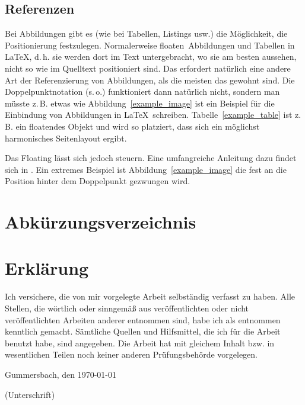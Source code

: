 \documentclass[12pt,oneside,a4paper,bibtotoc,liststotoc]{scrreprt}
\newcommand{\zB}{\mbox{z.\,B.}\xspace}
\newcommand{\dH}{\mbox{d.\,h.}\xspace}
\newcommand{\so}{\mbox{s.\,o.}\xspace}
\begin{document}
\section{Referenzen}

Bei Abbildungen gibt es (wie bei Tabellen, Listings usw.) die
Möglichkeit, die Positionierung festzulegen. Normalerweise \glqq
floaten\grqq\ Abbildungen und Tabellen in \LaTeX, \dH sie werden dort
im Text untergebracht, wo sie am besten aussehen, nicht so wie im
Quelltext positioniert sind. Das erfordert natürlich eine andere Art
der Referenzierung von Abbildungen, als die meisten das gewohnt
sind. Die Doppelpunktnotation (\so) funktioniert dann natürlich nicht,
sondern man müsste \zB etwas wie \glqq Abbildung~\ref{example_image}
ist ein Beispiel für die Einbindung von Abbildungen in \LaTeX \grqq\
schreiben. Tabelle~\ref{example_table} ist \zB ein floatendes Objekt
und wird so platziert, dass sich ein möglichst harmonisches
Seitenlayout ergibt.

Das Floating lässt sich jedoch steuern. Eine umfangreiche Anleitung
dazu findet sich in \cite[][]{WikibookFloats}. Ein extremes Beispiel
ist Abbildung~\ref{example_image} die fest an die Position hinter dem
Doppelpunkt gezwungen wird.

\chapter*{Abkürzungsverzeichnis}
\begin{acronym}[Acronms]

\end{acronym}

{}

\listoffigures

\listoftables

\lstlistoflistings


\appendix

\chapter{Erklärung}

Ich versichere, die von mir vorgelegte Arbeit selbständig verfasst zu
haben. Alle Stellen, die wörtlich oder sinngemäß aus veröffentlichten
oder nicht veröffentlichten Arbeiten anderer entnommen sind, habe ich
als entnommen kenntlich gemacht. Sämtliche Quellen und Hilfsmittel,
die ich für die Arbeit benutzt habe, sind angegeben. Die Arbeit hat
mit gleichem Inhalt bzw. in wesentlichen Teilen noch keiner anderen
Prüfungsbehörde vorgelegen.

\bigskip

Gummersbach, den \today

\bigskip

\bigskip

\bigskip

\bigskip

\bigskip

\bigskip

(Unterschrift)
\end{document}
